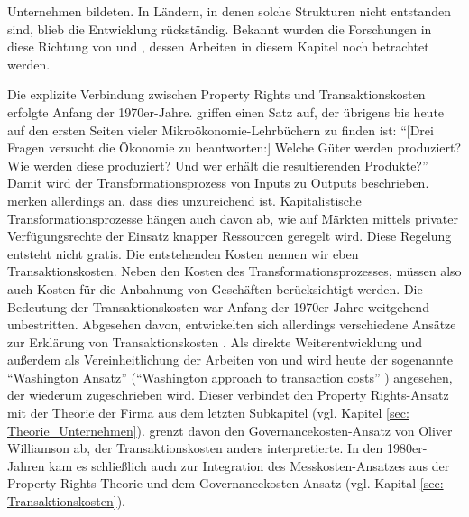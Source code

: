 Unternehmen bildeten. In Ländern, in denen solche Strukturen nicht entstanden sind, blieb die Entwicklung rückständig. Bekannt wurden die Forschungen in diese Richtung von \textcite{Soto2000} und \textcite{Acemoglu2012}, dessen Arbeiten in diesem Kapitel noch betrachtet werden.

Die explizite Verbindung zwischen Property Rights und Transaktionskosten erfolgte Anfang der 1970er-Jahre. \textcite{Alchian1973} griffen einen Satz auf, der übrigens bis heute auf den ersten Seiten vieler Mikroökonomie-Lehrbüchern zu finden ist: "`[Drei Fragen versucht die Ökonomie zu beantworten:] Welche Güter werden produziert? Wie werden diese produziert? Und wer erhält die resultierenden Produkte?"' Damit wird der Transformationsprozess von Inputs zu Outputs beschrieben. \textcite[S. 16]{Alchian1973} merken allerdings an, dass dies unzureichend ist. Kapitalistische Transformationsprozesse hängen auch davon ab, wie auf Märkten mittels privater Verfügungsrechte der Einsatz knapper Ressourcen geregelt wird. Diese Regelung entsteht nicht gratis. Die entstehenden Kosten nennen wir eben Transaktionskosten. Neben den Kosten des Transformationsprozesses, müssen also auch Kosten für die Anbahnung von Geschäften berücksichtigt werden. Die Bedeutung der Transaktionskosten war Anfang der 1970er-Jahre weitgehend unbestritten. Abgesehen davon, entwickelten sich allerdings verschiedene Ansätze zur Erklärung von Transaktionskosten \parencite[S. 33]{North1990}. Als direkte Weiterentwicklung und außerdem als Vereinheitlichung \parencite{Allen2022} der Arbeiten von \textcite{Coase1960} und \textcite{Alchian1965, Demsetz1967, Alchian1973} wird heute der sogenannte "`Washington Ansatz"' ("`Washington approach to transaction costs"' \parencite[S. 4]{Allen2024}) angesehen, der wiederum \textcite{Cheung1974, Cheung1983} zugeschrieben wird. Dieser verbindet den Property Rights-Ansatz mit der Theorie der Firma aus dem letzten Subkapitel (vgl. Kapitel \ref{sec: Theorie_Unternehmen}). \textcite{North1990} grenzt davon den Governancekosten-Ansatz von Oliver Williamson ab, der Transaktionskosten anders interpretierte. In den 1980er-Jahren kam es schließlich auch zur Integration des Messkosten-Ansatzes aus der Property Rights-Theorie und dem Governancekosten-Ansatz (vgl. Kapital \ref{sec: Transaktionskosten}).

